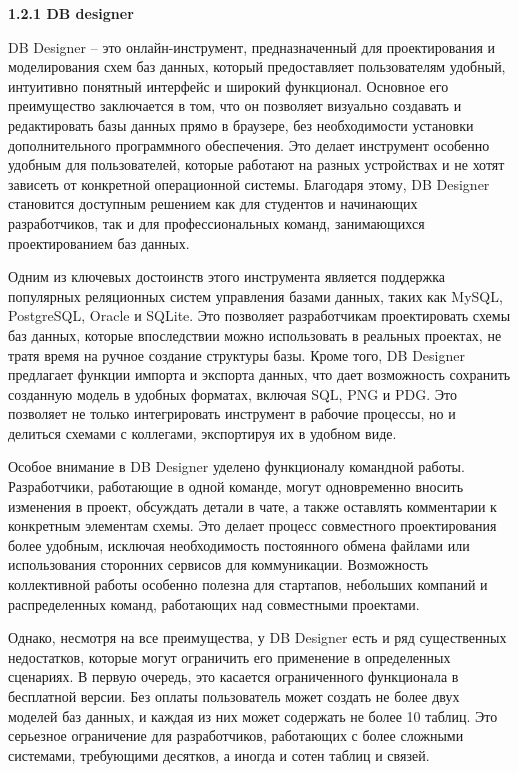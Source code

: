 \textbf{\large 1.2.1 DB designer }

DB Designer – это онлайн-инструмент, предназначенный для проектирования и моделирования схем баз данных, который предоставляет пользователям удобный, интуитивно понятный интерфейс и широкий функционал. Основное его преимущество заключается в том, что он позволяет визуально создавать и редактировать базы данных прямо в браузере, без необходимости установки дополнительного программного обеспечения. Это делает инструмент особенно удобным для пользователей, которые работают на разных устройствах и не хотят зависеть от конкретной операционной системы. Благодаря этому, DB Designer становится доступным решением как для студентов и начинающих разработчиков, так и для профессиональных команд, занимающихся проектированием баз данных.

Одним из ключевых достоинств этого инструмента является поддержка популярных реляционных систем управления базами данных, таких как MySQL, PostgreSQL, Oracle и SQLite. Это позволяет разработчикам проектировать схемы баз данных, которые впоследствии можно использовать в реальных проектах, не тратя время на ручное создание структуры базы. Кроме того, DB Designer предлагает функции импорта и экспорта данных, что дает возможность сохранить созданную модель в удобных форматах, включая SQL, PNG и PDG. Это позволяет не только интегрировать инструмент в рабочие процессы, но и делиться схемами с коллегами, экспортируя их в удобном виде.

Особое внимание в DB Designer уделено функционалу командной работы. Разработчики, работающие в одной команде, могут одновременно вносить изменения в проект, обсуждать детали в чате, а также оставлять комментарии к конкретным элементам схемы. Это делает процесс совместного проектирования более удобным, исключая необходимость постоянного обмена файлами или использования сторонних сервисов для коммуникации. Возможность коллективной работы особенно полезна для стартапов, небольших компаний и распределенных команд, работающих над совместными проектами.

Однако, несмотря на все преимущества, у DB Designer есть и ряд существенных недостатков, которые могут ограничить его применение в определенных сценариях. В первую очередь, это касается ограниченного функционала в бесплатной версии. Без оплаты пользователь может создать не более двух моделей баз данных, и каждая из них может содержать не более 10 таблиц. Это серьезное ограничение для разработчиков, работающих с более сложными системами, требующими десятков, а иногда и сотен таблиц и связей.

